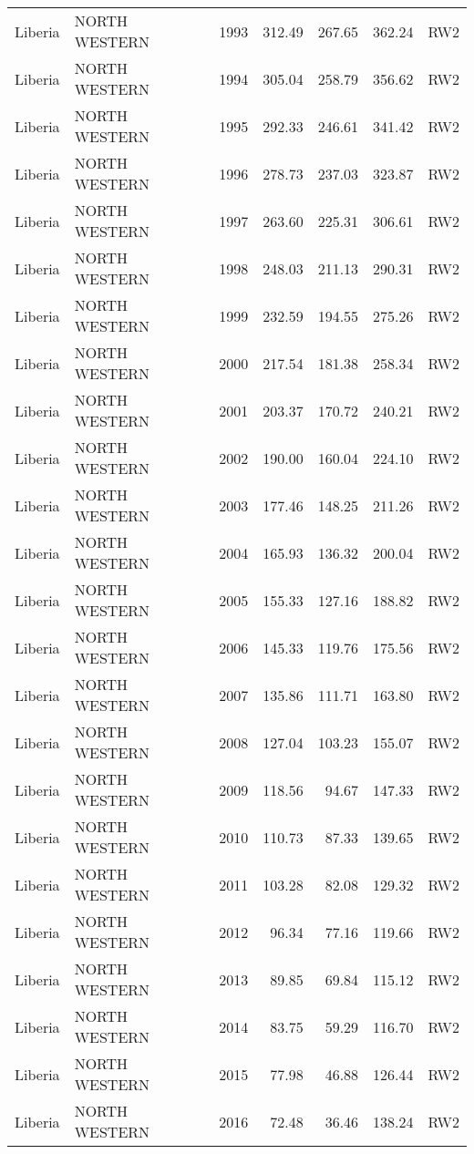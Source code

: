 \begin{longtable}{lllrrrl}
  Liberia & NORTH WESTERN & 1993 & 312.49 & 267.65 & 362.24 & RW2 \\ 
  Liberia & NORTH WESTERN & 1994 & 305.04 & 258.79 & 356.62 & RW2 \\ 
  Liberia & NORTH WESTERN & 1995 & 292.33 & 246.61 & 341.42 & RW2 \\ 
  Liberia & NORTH WESTERN & 1996 & 278.73 & 237.03 & 323.87 & RW2 \\ 
  Liberia & NORTH WESTERN & 1997 & 263.60 & 225.31 & 306.61 & RW2 \\ 
  Liberia & NORTH WESTERN & 1998 & 248.03 & 211.13 & 290.31 & RW2 \\ 
  Liberia & NORTH WESTERN & 1999 & 232.59 & 194.55 & 275.26 & RW2 \\ 
  Liberia & NORTH WESTERN & 2000 & 217.54 & 181.38 & 258.34 & RW2 \\ 
  Liberia & NORTH WESTERN & 2001 & 203.37 & 170.72 & 240.21 & RW2 \\ 
  Liberia & NORTH WESTERN & 2002 & 190.00 & 160.04 & 224.10 & RW2 \\ 
  Liberia & NORTH WESTERN & 2003 & 177.46 & 148.25 & 211.26 & RW2 \\ 
  Liberia & NORTH WESTERN & 2004 & 165.93 & 136.32 & 200.04 & RW2 \\ 
  Liberia & NORTH WESTERN & 2005 & 155.33 & 127.16 & 188.82 & RW2 \\ 
  Liberia & NORTH WESTERN & 2006 & 145.33 & 119.76 & 175.56 & RW2 \\ 
  Liberia & NORTH WESTERN & 2007 & 135.86 & 111.71 & 163.80 & RW2 \\ 
  Liberia & NORTH WESTERN & 2008 & 127.04 & 103.23 & 155.07 & RW2 \\ 
  Liberia & NORTH WESTERN & 2009 & 118.56 & 94.67 & 147.33 & RW2 \\ 
  Liberia & NORTH WESTERN & 2010 & 110.73 & 87.33 & 139.65 & RW2 \\ 
  Liberia & NORTH WESTERN & 2011 & 103.28 & 82.08 & 129.32 & RW2 \\ 
  Liberia & NORTH WESTERN & 2012 & 96.34 & 77.16 & 119.66 & RW2 \\ 
  Liberia & NORTH WESTERN & 2013 & 89.85 & 69.84 & 115.12 & RW2 \\ 
  Liberia & NORTH WESTERN & 2014 & 83.75 & 59.29 & 116.70 & RW2 \\ 
  Liberia & NORTH WESTERN & 2015 & 77.98 & 46.88 & 126.44 & RW2 \\ 
  Liberia & NORTH WESTERN & 2016 & 72.48 & 36.46 & 138.24 & RW2 \\ 

\end{longtable}
